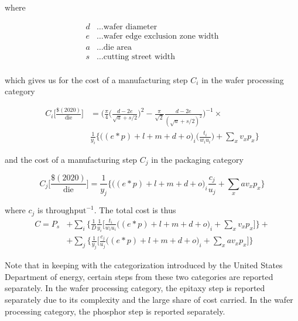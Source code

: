\documentclass{article}
\begin{document}
where

\begin{align*}
    d &\dots \text{wafer diameter} \\
    e &\dots \text{wafer edge exclusion zone width} \\
    a &\dots \text{die area} \\
    s &\dots \text{cutting street width} \\
\end{align*}

which gives us for the cost of a manufacturing step $C_i$ in the wafer processing category

\begin{equation}
\label{eqn:cost_wafer_full}
\begin{split}
    C_i \bigg[ \frac{ \$(2020) }{ \text{die} } \bigg] &= \bigg (  \frac{\pi}{4}  \bigg ( \frac{d-2e}{\sqrt{a}+s/2} \bigg ) ^2 - \frac{\pi}{\sqrt{2}}\frac{d-2e}{(\sqrt{a}+s/2)^2} \bigg )^{-1} \times \\
    &  \frac{1}{y_i}  \bigg\{ \bigg((e*p) + l + m + d +o \bigg)_i \bigg( \frac{t_i}{w_i u_i} \bigg) + \sum_{x} v_x p_x \bigg\}
\end{split}
\end{equation}

and the cost of a manufacturing step $C_j$ in the packaging category

\begin{equation}
\label{eqn:cost_die}
    C_j \bigg[ \frac{ \$(2020) }{ \text{die} } \bigg] = \frac{1}{y_j}  \bigg\{ \bigg((e*p) + l + m + d + o \bigg)_i  \frac{c_j}{u_j} + \sum_{x} a v_x p_x \bigg\}
\end{equation}

where $c_j$ is $\text{throughput}^{-1}$. The total cost is thus
\begin{equation}
\label{eqn:cost_total}
\begin{split}
    C= P_s &+ \sum_i \bigg \{ \frac{1}{D} \frac{1}{y_i} \bigg[ \frac{t_i}{w_i u_i} \bigg((e*p) + l + m + d +o \bigg)_i  + \sum_{x} v_x p_x \bigg] \bigg \} + \\
    & + \sum_j \bigg \{ \frac{1}{y_j} \bigg[ \frac{c_j}{u_j}  \bigg((e*p) + l + m + d + o \bigg)_i + \sum_{x} a v_x p_x \bigg ] \bigg\}
\end{split}
\end{equation}

Note that in keeping with the categorization introduced by the United States Department of energy, certain steps from these two categories are reported separately. In the wafer processing category, the epitaxy step is reported separately due to its complexity and the large share of cost carried. In the wafer processing category, the phosphor step is reported separately.
\end{document}
